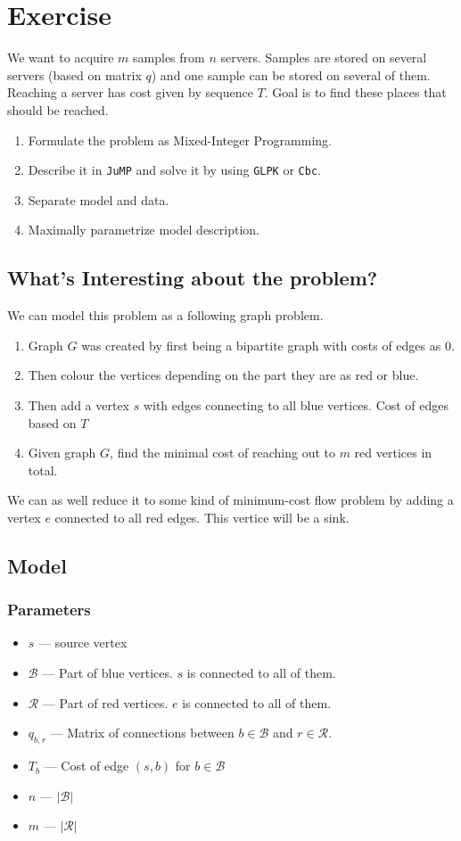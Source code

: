 \section{Exercise}
We want to acquire $m$ samples from $n$ servers. 
Samples are stored on several servers (based on matrix $q$) and one sample can be stored on several of them.
Reaching a server has cost given by sequence $T$.
Goal is to find these places that should be reached.

\begin{enumerate}
    \item Formulate the problem as Mixed-Integer Programming. \done
    \item Describe it in \texttt{JuMP} and solve it by using \texttt{GLPK} or \texttt{Cbc}. 
    \item Separate model and data.
    \item Maximally parametrize model description.
\end{enumerate}

\subsection{What's Interesting about the problem?}
We can model this problem as a following graph problem. 
\begin{enumerate}
    \item Graph $G$ was created by first being a bipartite graph with costs of edges as $0$. 
    \item Then colour the vertices depending on the part they are as red or blue. 
    \item Then add a vertex $s$ with edges connecting to all blue vertices. Cost of edges based on $T$
    \item Given graph $G$, find the minimal cost of reaching out to $m$ red vertices in total.
\end{enumerate}
We can as well reduce it to some kind of minimum-cost flow problem by adding a vertex $e$ connected to all red edges. 
This vertice will be a sink.

\subsection{Model}
\subsubsection*{Parameters}
\begin{itemize}
    \item $s$ --- source vertex
    \item $\mathcal{B}$ --- Part of blue vertices. $s$ is connected to all of them.
    \item $\mathcal{R}$ --- Part of red vertices. $e$ is connected to all of them.
    \item $q_{b,r}$ --- Matrix of connections between $b \in \mathcal{B}$ and $r \in \mathcal{R}$. 
    \item $T_b$ --- Cost of edge $(s, b)$ for $b \in \mathcal{B}$
    \item $n$ --- $|\mathcal{B}|$
    \item $m$ --- $|\mathcal{R}|$
\end{itemize}
